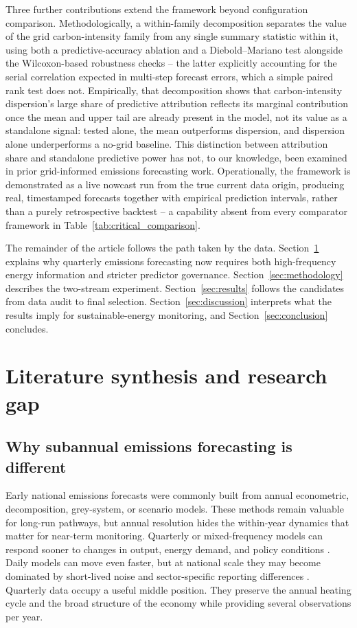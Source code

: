 \documentclass[preprint,12pt]{elsarticle}
\begin{document}
Three further contributions extend the framework beyond configuration comparison. Methodologically, a within-family decomposition separates the value of the grid carbon-intensity family from any single summary statistic within it, using both a predictive-accuracy ablation and a Diebold--Mariano test alongside the Wilcoxon-based robustness checks -- the latter explicitly accounting for the serial correlation expected in multi-step forecast errors, which a simple paired rank test does not. Empirically, that decomposition shows that carbon-intensity dispersion's large share of predictive attribution reflects its marginal contribution once the mean and upper tail are already present in the model, not its value as a standalone signal: tested alone, the mean outperforms dispersion, and dispersion alone underperforms a no-grid baseline. This distinction between attribution share and standalone predictive power has not, to our knowledge, been examined in prior grid-informed emissions forecasting work. Operationally, the framework is demonstrated as a live nowcast run from the true current data origin, producing real, timestamped forecasts together with empirical prediction intervals, rather than a purely retrospective backtest -- a capability absent from every comparator framework in Table~\ref{tab:critical_comparison}.

The remainder of the article follows the path taken by the data. Section~\ref{sec:literature} explains why quarterly emissions forecasting now requires both high-frequency energy information and stricter predictor governance. Section~\ref{sec:methodology} describes the two-stream experiment. Section~\ref{sec:results} follows the candidates from data audit to final selection. Section~\ref{sec:discussion} interprets what the results imply for sustainable-energy monitoring, and Section~\ref{sec:conclusion} concludes.

\section{Literature synthesis and research gap}\label{sec:literature}

\subsection{Why subannual emissions forecasting is different}

Early national emissions forecasts were commonly built from annual econometric, decomposition, grey-system, or scenario models. These methods remain valuable for long-run pathways, but annual resolution hides the within-year dynamics that matter for near-term monitoring. Quarterly or mixed-frequency models can respond sooner to changes in output, energy demand, and policy conditions \citep{an2024,fosten2025}. Daily models can move even faster, but at national scale they may become dominated by short-lived noise and sector-specific reporting differences \citep{zhong2024}. Quarterly data occupy a useful middle position. They preserve the annual heating cycle and the broad structure of the economy while providing several observations per year.
\end{document}
